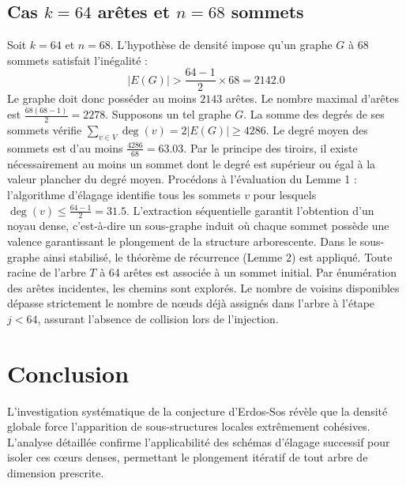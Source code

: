 \documentclass[12pt,a4paper]{article}
\begin{document}
\subsection{Cas $k = 64$ arêtes et $n = 68$ sommets}
Soit $k = 64$ et $n = 68$. L'hypothèse de densité impose qu'un graphe $G$ à 68 sommets satisfait l'inégalité :
$$ |E(G)| > \frac{64-1}{2} \times 68 = 2142.0 $$
Le graphe doit donc posséder au moins $2143$ arêtes. Le nombre maximal d'arêtes est $\frac{68(68-1)}{2} = 2278$.
Supposons un tel graphe $G$. La somme des degrés de ses sommets vérifie $\sum_{v \in V} \deg(v) = 2|E(G)| \geq 4286$.
Le degré moyen des sommets est d'au moins $\frac{4286}{68} = 63.03$.
Par le principe des tiroirs, il existe nécessairement au moins un sommet dont le degré est supérieur ou égal à la valeur plancher du degré moyen.
Procédons à l'évaluation du Lemme 1 : l'algorithme d'élagage identifie tous les sommets $v$ pour lesquels $\deg(v) \leq \frac{64-1}{2} = 31.5$.
L'extraction séquentielle garantit l'obtention d'un noyau dense, c'est-à-dire un sous-graphe induit où chaque sommet possède une valence garantissant le plongement de la structure arborescente.
Dans le sous-graphe ainsi stabilisé, le théorème de récurrence (Lemme 2) est appliqué. Toute racine de l'arbre $T$ à 64 arêtes est associée à un sommet initial. Par énumération des arêtes incidentes, les chemins sont explorés. Le nombre de voisins disponibles dépasse strictement le nombre de nœuds déjà assignés dans l'arbre à l'étape $j < 64$, assurant l'absence de collision lors de l'injection.

\section{Conclusion}

L'investigation systématique de la conjecture d'Erdos-Sos révèle que la densité globale force l'apparition de sous-structures locales extrêmement cohésives. L'analyse détaillée confirme l'applicabilité des schémas d'élagage successif pour isoler ces cœurs denses, permettant le plongement itératif de tout arbre de dimension prescrite.
\end{document}
